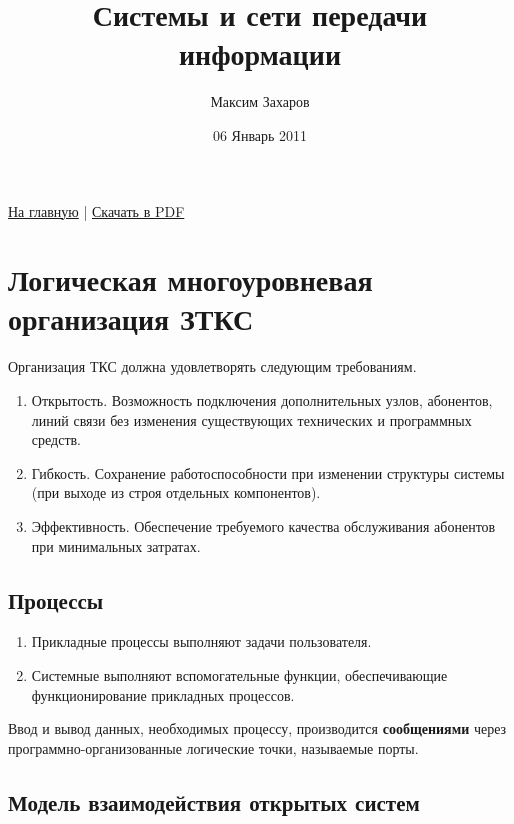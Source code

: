 \documentclass[12pt, russian, oneside, article]{ncc}
\begin{document}
\title{Системы и сети передачи информации}
\author{Максим Захаров}
\date{06 Январь 2011}
\maketitle

\setcounter{tocdepth}{3}
\tableofcontents
\vspace*{1cm}


\href{file:///home/maxim/Documents/Git/lectures/index.org}{На главную} | \href{file:///home/maxim/Documents/Git/lectures/other/SiSPI_Lectures.pdf}{Скачать в PDF}

\section{Логическая многоуровневая организация ЗТКС}
\label{sec-1}


Организация ТКС должна удовлетворять следующим требованиям.
\begin{enumerate}
\item Открытость. Возможность подключения дополнительных узлов, абонентов, линий связи без изменения существующих технических и программных средств.
\item Гибкость. Сохранение работоспособности при изменении структуры системы (при выходе из строя отдельных компонентов).
\item Эффективность. Обеспечение требуемого качества обслуживания абонентов при минимальных затратах.
\end{enumerate}
  
\subsection{Процессы}
\label{sec-1_1}


\begin{enumerate}
\item Прикладные процессы выполняют задачи пользователя.
\item Системные выполняют вспомогательные функции, обеспечивающие функционирование прикладных процессов.
\end{enumerate}

Ввод и вывод данных, необходимых процессу, производится \textbf{сообщениями} через программно-организованные логические точки, называемые порты.
\subsection{Модель взаимодействия открытых систем}
\label{sec-1_2}
\end{document}
